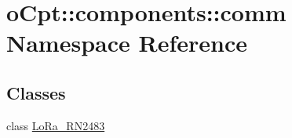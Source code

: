 \hypertarget{namespaceo_cpt_1_1components_1_1comm}{}\section{o\+Cpt\+:\+:components\+:\+:comm Namespace Reference}
\label{namespaceo_cpt_1_1components_1_1comm}
\subsection*{Classes}
\begin{DoxyCompactItemize}
\item 
class \hyperlink{classo_cpt_1_1components_1_1comm_1_1_lo_ra___r_n2483}{Lo\+Ra\+\_\+\+R\+N2483}
\end{DoxyCompactItemize}
